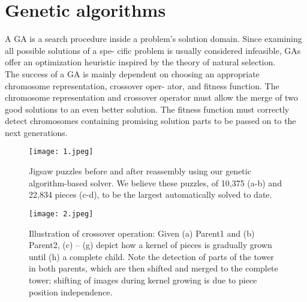 \documentclass[10pt,twocolumn,letterpaper]{article}
\begin{document}
\section{Genetic algorithms}
A GA is a search procedure inside a problem’s solution domain. Since examining all possible solutions of a spe- cific problem is usually considered infeasible, GAs offer an optimization heuristic inspired by the theory of natural selection.\\
\indent The success of a GA is mainly dependent on choosing an appropriate chromosome representation, crossover oper- ator, and fitness function. The chromosome representation and crossover operator must allow the merge of two good solutions to an even better solution. The fitness function must correctly detect chromosomes containing promising solution parts to be passed on to the next generations.\\
\begin{figure}[htbp]
\centering
\texttt{[image: 1.jpeg]}
\caption{Jigsaw puzzles before and after reassembly using our genetic algorithm-based solver. We believe these puzzles, of 10,375 (a-b) and 22,834 pieces (c-d), to be the largest automatically solved to date.}
\label{fig1}
\end{figure}
\begin{figure*}
\begin{center}
\texttt{[image: 2.jpeg]}
\end{center}
\caption{Illustration of crossover operation: Given (a) Parent1 and (b) Parent2, (c) – (g) depict how a kernel of pieces is gradually grown until (h) a complete child. Note the detection of parts of the tower in both parents, which are then shifted and merged to the complete tower; shifting of images during kernel growing is due to piece position independence.}
\label{fig2}
\end{figure*}
\end{document}

